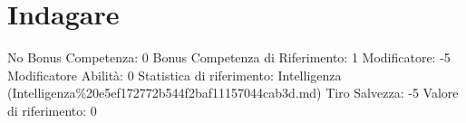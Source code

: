 \section{Indagare}\label{indagare}

\begin{description}
\tightlist
\item[Tags: ABI]
No Bonus Competenza: 0 Bonus Competenza di Riferimento: 1 Modificatore:
-5 Modificatore Abilità: 0 Statistica di riferimento: Intelligenza
(Intelligenza\%20e5ef172772b544f2baf11157044cab3d.md) Tiro Salvezza: -5
Valore di riferimento: 0
\end{description}
